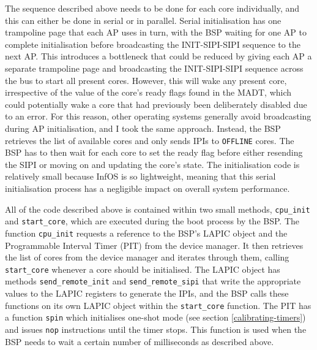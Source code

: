 \documentclass[bsc,frontabs,singlespacing,parskip,deptreport]{infthesis}
\begin{document}
The sequence described above needs to be done for each core individually, and this can either be done in serial or in parallel. Serial initialisation has one trampoline page that each AP uses in turn, with the BSP waiting for one AP to complete initialisation before broadcasting the INIT-SIPI-SIPI sequence to the next AP. This introduces a bottleneck that could be reduced by giving each AP a separate trampoline page and broadcasting the INIT-SIPI-SIPI sequence across the bus to start all present cores. However, this will wake any present core, irrespective of the value of the core's ready flags found in the MADT, which could potentially wake a core that had previously been deliberately disabled due to an error. For this reason, other operating systems generally avoid broadcasting during AP initialisation, and I took the same approach. Instead, the BSP retrieves the list of available cores and only sends IPIs to \verb|OFFLINE| cores. The BSP has to then wait for each core to set the ready flag before either resending the SIPI or moving on and updating the core's state. The initialisation code is relatively small because InfOS is so lightweight, meaning that this serial initialisation process has a negligible impact on overall system performance. 

All of the code described above is contained within two small methods, \verb|cpu_init| and \verb|start_core|, which are executed during the boot process by the BSP. The function \verb|cpu_init| requests a reference to the BSP's LAPIC object and the Programmable Interval Timer (PIT) from the device manager. It then retrieves the list of cores from the device manager and iterates through them, calling \verb|start_core| whenever a core should be initialised. The LAPIC object has methods \verb|send_remote_init| and \verb|send_remote_sipi| that write the appropriate values to the LAPIC registers to generate the IPIs, and the BSP calls these functions on its own LAPIC object within the \verb|start_core| function. The PIT has a function \verb|spin| which initialises one-shot mode (see section \ref{calibrating-timers}) and issues \verb|nop| instructions until the timer stops. This function is used when the BSP needs to wait a certain number of milliseconds as described above.
\end{document}

